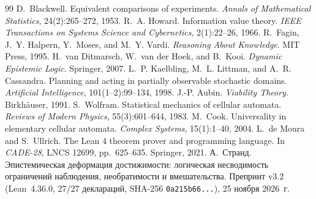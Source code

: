 \documentclass[10pt,a4paper]{article}
\newcommand{\code}[1]{\nolinkurl{#1}}
\begin{document}
\begin{thebibliography}{99}
\small
{} D.~Blackwell. Equivalent comparisons of experiments. \emph{Annals of Mathematical Statistics}, 24(2):265--272, 1953.
 R.~A. Howard. Information value theory. \emph{IEEE Transactions on Systems Science and Cybernetics}, 2(1):22--26, 1966.
 R.~Fagin, J.~Y. Halpern, Y.~Moses, and M.~Y. Vardi. \emph{Reasoning About Knowledge}. MIT Press, 1995.
 H.~van Ditmarsch, W.~van der Hoek, and B.~Kooi. \emph{Dynamic Epistemic Logic}. Springer, 2007.
 L.~P. Kaelbling, M.~L. Littman, and A.~R. Cassandra. Planning and acting in partially observable stochastic domains. \emph{Artificial Intelligence}, 101(1--2):99--134, 1998.
 J.-P. Aubin. \emph{Viability Theory}. Birkh\"auser, 1991.
 S.~Wolfram. Statistical mechanics of cellular automata. \emph{Reviews of Modern Physics}, 55(3):601--644, 1983.
 M.~Cook. Universality in elementary cellular automata. \emph{Complex Systems}, 15(1):1--40, 2004.
 L.~de Moura and S.~Ullrich. The Lean 4 theorem prover and programming language. In \emph{CADE-28}, LNCS 12699, pp.~625--635. Springer, 2021.
 А.~Странд. Эпистемическая деформация достижимости: логическая несводимость ограничений наблюдения, необратимости и вмешательства. Препринт v3.2 (Lean~4.36.0, 27/27 деклараций, SHA-256 \code{0a215b66...}), 25 ноября 2026~г.
\end{thebibliography}
\end{document}
